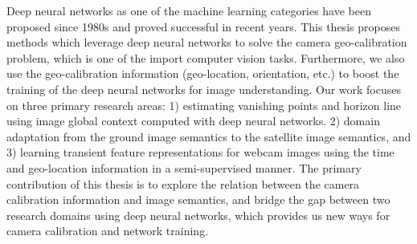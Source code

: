Deep neural networks as one of the machine learning categories have been proposed
since 1980s and proved successful in recent years. This thesis proposes methods which
leverage deep neural networks to solve the camera geo-calibration problem, which is
one of the import computer vision tasks. Furthermore, we also use the geo-calibration
information (geo-location, orientation, etc.) to boost the training of the deep neural
networks for image understanding.
Our work focuses on three primary research areas: 1) estimating vanishing points
and horizon line using image global context computed with deep neural networks. 2)
domain adaptation from the ground image semantics to the satellite image semantics,
and 3) learning transient feature representations for webcam images using the time
and geo-location information in a semi-supervised manner.
The primary contribution of this thesis is to explore the relation between the
camera calibration information and image semantics, and bridge the gap between
two research domains using deep neural networks, which provides us new ways for
camera calibration and network training.
